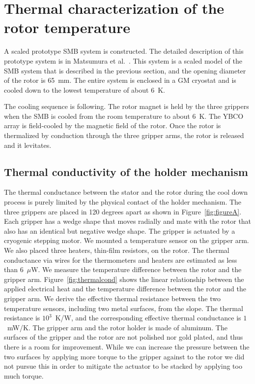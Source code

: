 \documentclass[journal]{IEEEtran}
\begin{document}
\section{Thermal characterization of the rotor temperature}
A scaled prototype SMB system is constructed.
The detailed description of this prototype system is in Matsumura et al.~\cite{matsumura_eucas2015}.
This system is a scaled model of the SMB system that is described in the previous section, and the opening diameter of the rotor is 65~mm.
The entire system is enclosed in a GM cryostat and is cooled down to the lowest temperature of about 6~K.

The cooling sequence is following.
The rotor magnet is held by the three grippers when the SMB is cooled from the room temperature to about 6~K.
The YBCO array is field-cooled by the magnetic field of the rotor.
Once the rotor is thermalized by conduction through the three gripper arms, the rotor is released and it levitates.

\subsection{Thermal conductivity of the holder mechanism}
The thermal conductance between the stator and the rotor during the cool down process is purely limited by the physical contact of the holder mechanism.
The three grippers are placed in 120 degrees apart as shown in Figure~\ref{fig:figureA}.
Each gripper has a wedge shape that moves radially and mate with the rotor that also has an identical but negative wedge shape.
The gripper is actuated by a cryogenic stepping motor.
We mounted a temperature sensor on the gripper arm.
We also placed three heaters, thin-film resistors, on the rotor.
The thermal conductance via wires for the thermometers and heaters are estimated as less than 6~$\mu$W.
We measure the temperature difference between the rotor and the gripper arm.
Figure~\ref{fig:thermalcond} shows the linear relationship between the applied electrical heat and the temperature difference between the rotor and the gripper arm.
We derive the effective thermal resistance between the two temperature sensors, including two metal surfaces, from the slope.
The thermal resistance is $10^{3}$~K/W, and the corresponding effective thermal conductance is $1$~mW/K.
The gripper arm and the rotor holder is made of aluminum.
The surfaces of the gripper and the rotor are not polished nor gold plated, and thus there is a room for improvement.
While we can increase the pressure between the two surfaces by applying more torque to the gripper against to the rotor we did not pursue this in order to mitigate the actuator to be stacked by applying too much torque.
\end{document}
